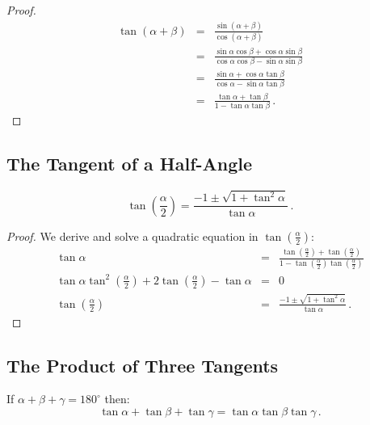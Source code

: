 \begin{proof}

\begin{eqnarray*}
\tan (\alpha+\beta) &=& \frac{\sin(\alpha+\beta)}{\cos(\alpha+\beta)}\\
&=&\frac{\sin\alpha\cos\beta+\cos\alpha\sin\beta}{\cos\alpha\cos\beta-\sin\alpha\sin\beta}\\
&=&\frac{\sin\alpha+\cos\alpha\tan\beta}{\cos\alpha-\sin\alpha\tan\beta}\\
&=&\frac{\tan\alpha+\tan\beta}{1-\tan\alpha\tan\beta}\,.
\end{eqnarray*}

\end{proof}


\subsection{The Tangent of a Half-Angle}\label{s.tangent-half}
\begin{theorem}\label{thm.tangent-half}
\[
\tan\left(\frac{\alpha}{2}\right) = \frac{-1\pm\sqrt{1+\tan^2\alpha}}{\tan\alpha}\,.
\]
\end{theorem}
\begin{proof}
We derive and solve a quadratic equation in $\displaystyle\tan\left(\displaystyle\frac{\alpha}{2}\right)$:
\begin{displaymath}
\begin{array}{lll}
\tan \alpha&=&\displaystyle\frac{
  \tan\left(\displaystyle\frac{\alpha}{2}\right)+
  \tan\left(\displaystyle\frac{\alpha}{2}\right)
  }{
  1-\tan\left(\displaystyle\frac{\alpha}{2}\right)
    \tan\left(\displaystyle\frac{\alpha}{2}\right)
  }\\
\tan\alpha \tan^2  \left(\displaystyle\frac{\alpha}{2}\right) + 2 \tan \left(\displaystyle\frac{\alpha}{2}\right) -\tan\alpha &=&0\\
\tan\left(\displaystyle\frac{\alpha}{2}\right) &=& \displaystyle\frac{-1\pm\sqrt{1+\tan^2\alpha}}{\tan\alpha}\,.
\end{array}
\end{displaymath}
\end{proof}


\newpage

\subsection{The Product of Three Tangents}\label{s.tangent-three}
\begin{theorem}\label{thm.tangent3}
If $\alpha+\beta+\gamma=180^\circ$ then:
\[
\tan\alpha+\tan\beta+\tan\gamma = \tan\alpha\tan\beta\tan\gamma\,.
\]
\end{theorem}

